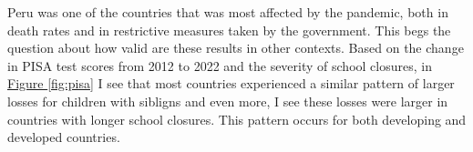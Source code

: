 Peru was one of the countries that was most affected by the pandemic, both in death rates and in restrictive measures taken by the government. This begs the question about how valid are these results in other contexts. Based on the change in PISA test scores from 2012 to 2022 and the severity of school closures, in \hyperref[fig:pisa]{Figure \ref{fig:pisa}} I see that most countries experienced a similar pattern of larger losses for children with sibligns and even more, I see these losses were larger in countries with longer school closures. This pattern occurs for both developing and developed countries.





